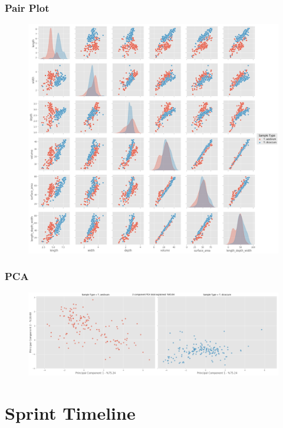 \documentclass[11pt]{report}
\begin{document}
\subsection{Pair Plot}
\label{sec:orgff67ec9}

\begin{figure}[htbp]
\centering
\includegraphics[width=18cm]{./images/results/group6/pairplot.png}
\label{fig:org0af828f}
\end{figure}

\clearpage
\subsection{PCA}
\label{sec:org22e9acc}
\begin{figure}[htbp]
\centering
\includegraphics[width=18cm]{./images/results/group6/pca.png}
\label{fig:org1f066cc}
\end{figure}
\clearpage

\chapter{Sprint Timeline}
\label{sec:org7a3d7c1}
\label{org8014053}
\end{document}
